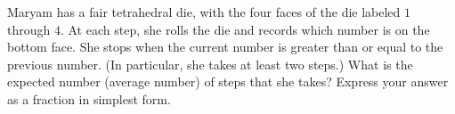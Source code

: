 Maryam has a fair tetrahedral die, with the four faces of the die labeled $1$ through $4$. At each step, she rolls the die and records which number is on the bottom face. She stops when the current number is greater than or equal to the previous number. (In particular, she takes at least two steps.) What is the expected number (average number) of steps that she takes? Express your answer as a fraction in simplest form.